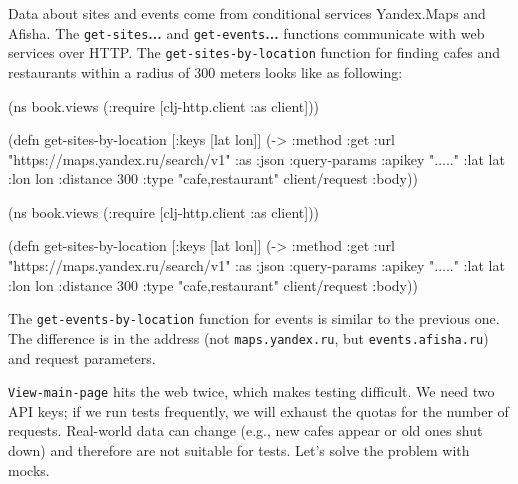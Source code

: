 \fi

Data about sites and events come from conditional services Yandex.Maps and Afisha. The \verb|get-sites|\textbf{...} and \verb|get-events|\textbf{...} functions communicate with web services over HTTP. The \verb|get-sites-by-location| function for finding cafes and restaurants within a radius of 300 meters looks like as following:


\ifnarrow

\begin{english}
  \begin{clojure}
(ns book.views
  (:require
   [clj-http.client :as client]))

(defn get-sites-by-location
  [{:keys [lat lon]}]
  (-> {:method :get
       :url
       "https://maps.yandex.ru/search/v1"
       :as :json
       :query-params
       {:apikey "....."
        :lat lat :lon lon :distance 300
        :type "cafe,restaurant"}}
      client/request
      :body))
  \end{clojure}
\end{english}

\else

\begin{english}
  \begin{clojure}
(ns book.views
  (:require [clj-http.client :as client]))

(defn get-sites-by-location
  [{:keys [lat lon]}]
  (-> {:method :get
       :url "https://maps.yandex.ru/search/v1"
       :as :json
       :query-params {:apikey "....."
                      :lat lat :lon lon :distance 300
                      :type "cafe,restaurant"}}
      client/request
      :body))
  \end{clojure}
\end{english}

\fi

The \verb|get-events-by-location| function for events is similar to the previous one. The difference is in the address (not \verb|maps.yandex.ru|, but \verb|events.afisha.ru|) and request parameters.

\verb|View-main-page| hits the web twice, which makes testing difficult. We need two API keys; if we run tests frequently, we will exhaust the quotas for the number of requests. Real-world data can change (e.g., new cafes appear or old ones shut down) and therefore are not suitable for tests. Let's solve the problem with mocks.


